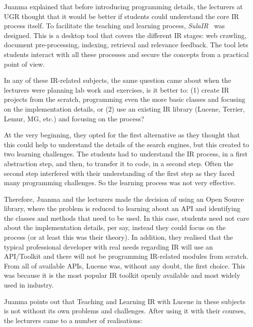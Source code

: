 Juanma explained that before introducing programming details, the lecturers at UGR thought that it would be better if  students could understand the core IR process itself. To facilitate the teaching and learning process, {\it SulaIR}~\cite{Fernandez2012} was designed. This is a desktop tool that covers the different IR stages: web crawling, document pre-processing,  indexing, retrieval and relevance feedback. The tool lets students interact with all these processes and secure the concepts from a practical point of view. 

In any of these IR-related subjects, the same question came about when the lecturers were planning 
lab work and exercises, is it better to: (1) create IR projects from the scratch, programming even the more basic classes and focusing on the implementation details, or (2) use an existing IR library (Lucene, Terrier, Lemur, MG, etc.) and focusing on the process?

At the very beginning, they opted for the first alternative as they thought that this could help to understand the details of the search engines, but this created to two learning challenges. The students had to understand the IR process, in a first abstraction step,  and then, to transfer it to code, in a second step. Often the second step interfered with their understanding of the first step as they faced many programming challenges. So the learning process was not very effective.

Therefore, Juanma and the lecturers made the decision of using an Open Source library, where the problem is reduced to learning about an API and identifying the classes and methods that need to be used. In this case, students need not care about the implementation details, per say, instead they could focus on the process (or at least this was their theory). In addition, they realised that the typical professional developer with real needs regarding IR will use an API/Toolkit and there will not be programming IR-related modules from scratch. From all of available APIs, Lucene was, without any doubt, the first choice. This was because it is the most popular IR toolkit openly available and most widely used in industry.

Juanma points out that Teaching and Learning IR with Lucene in these subjects is not without its own problems and challenges. After using it with their courses, the lecturers came to a number of realisations:

